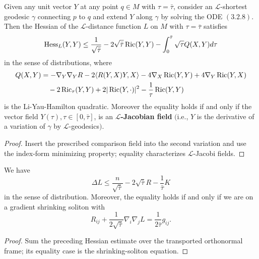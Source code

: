 \begin{proposition}
  \label{prop:cz-l-jacobi-comparison-inequality}
Given any unit vector $Y$ at any point $q \in M$ with
$\tau=\bar{\tau}$, consider an $\mathcal{L}$-shortest geodesic
$\gamma$ connecting $p$ to $q$ and extend $Y$ along $\gamma$ by
solving the {\rm ODE} $(3.2.8)$. Then the Hessian of the
$\mathcal{L}$-distance function $L$ on $M$ with $\tau=\bar{\tau}$
satisfies
$$
{\rm
Hess}_L(Y,Y)\leq\frac{1}{\sqrt{\bar{\tau}}}-2\sqrt{\bar{\tau}}\operatorname{Ric}(Y,Y)
-\int_0^{\bar{\tau}}\sqrt{{\tau}}Q(X,Y)d\tau
$$
in the sense of distributions, where
\begin{align*}
Q(X,Y)&  = -\nabla_Y\nabla_YR-2\langle R(Y,X)Y,X\rangle
-4\nabla_X \operatorname{Ric}(Y,Y)+4\nabla_Y \operatorname{Ric}(Y,X)\\
&\quad -2\operatorname{Ric}_\tau(Y,Y)+2|\operatorname{Ric}(Y,\cdot)|^2-\frac{1}{\tau}\operatorname{Ric}(Y,Y)
\end{align*}
is the Li-Yau-Hamilton quadratic. Moreover the equality holds if
and only if the vector field $Y(\tau),\tau\in[0,\bar{\tau}]$, is
an {\bf $\mathcal{L}$-Jacobian field} $($i.e., $Y$ is the
derivative of a variation of $\gamma$ by
$\mathcal{L}$-geodesics$)$.
\end{proposition}

\begin{proof}
  \sketch Insert the prescribed comparison field into the second variation and use the index-form minimizing property; equality characterizes $\mathcal L$-Jacobi fields.
\end{proof}

\begin{corollary}
  \label{cor:cz-distributional-comparison-for-reduced-distance}
We have
$$
\Delta L\leq\frac{n}{\sqrt{\bar{\tau}}}
-2\sqrt{\bar{\tau}}R-\frac{1}{\bar{\tau}}K
$$
in the sense of distribution. Moreover, the equality holds if and
only if we are on a gradient shrinking soliton with
$$
R_{ij}+\frac{1}{2\sqrt{\bar\tau}}\nabla_i\nabla_jL
=\frac{1}{2\bar\tau}g_{ij}.$$
\end{corollary}

\begin{proof}
  \sketch Sum the preceding Hessian estimate over the transported orthonormal frame; its equality case is the shrinking-soliton equation.
\end{proof}

